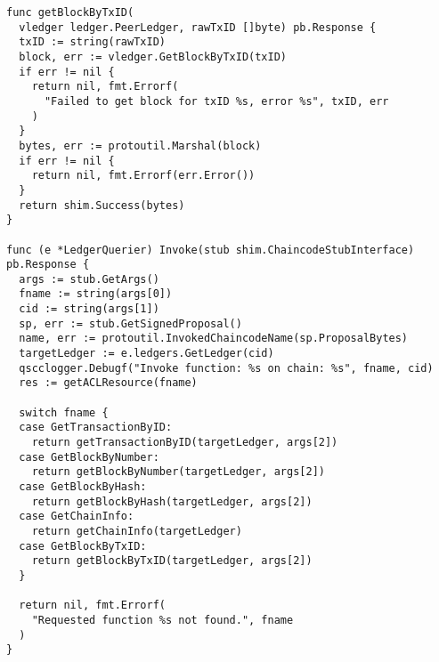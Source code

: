\begin{verbatim}
func getBlockByTxID(
  vledger ledger.PeerLedger, rawTxID []byte) pb.Response {
  txID := string(rawTxID)
  block, err := vledger.GetBlockByTxID(txID)
  if err != nil {
    return nil, fmt.Errorf(
      "Failed to get block for txID %s, error %s", txID, err
    )
  }
  bytes, err := protoutil.Marshal(block)
  if err != nil {
    return nil, fmt.Errorf(err.Error())
  }
  return shim.Success(bytes)
}

func (e *LedgerQuerier) Invoke(stub shim.ChaincodeStubInterface) pb.Response {
  args := stub.GetArgs()
  fname := string(args[0])
  cid := string(args[1])
  sp, err := stub.GetSignedProposal()
  name, err := protoutil.InvokedChaincodeName(sp.ProposalBytes)
  targetLedger := e.ledgers.GetLedger(cid)
  qscclogger.Debugf("Invoke function: %s on chain: %s", fname, cid)
  res := getACLResource(fname)

  switch fname {
  case GetTransactionByID:
    return getTransactionByID(targetLedger, args[2])
  case GetBlockByNumber:
    return getBlockByNumber(targetLedger, args[2])
  case GetBlockByHash:
    return getBlockByHash(targetLedger, args[2])
  case GetChainInfo:
    return getChainInfo(targetLedger)
  case GetBlockByTxID:
    return getBlockByTxID(targetLedger, args[2])
  }

  return nil, fmt.Errorf(
    "Requested function %s not found.", fname
  )
}
\end{verbatim}